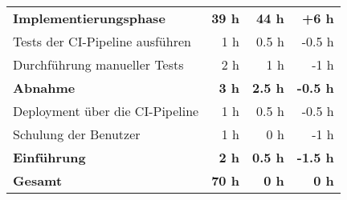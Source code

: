\begin{tabularx}{\textwidth}{Xrrr}
\rowcolor{heading}\textbf{Implementierungsphase} & \textbf{39 h} & \textbf{44 h} & \textbf{+6 h} \\
Tests der CI-Pipeline ausführen & 1 h & 0.5 h   & -0.5 h \\
\rowcolor{odd}Durchführung manueller Tests & 2 h & 1 h & -1 h \\
\rowcolor{heading}\textbf{Abnahme} & \textbf{3 h} & \textbf{2.5 h} & \textbf{-0.5 h} \\
Deployment über die CI-Pipeline & 1 h   & 0.5 h   & -0.5 h \\
\rowcolor{odd}Schulung der Benutzer & 1 h & 0 h & -1 h \\
\rowcolor{heading}\textbf{Einführung} & \textbf{2 h} & \textbf{0.5 h} & \textbf{-1.5 h} \\
\hline
\hline
\rowcolor{heading}\textbf{Gesamt} & \textbf{70 h} & \textbf{0 h} & \textbf{0 h} \\
\end{tabularx}
